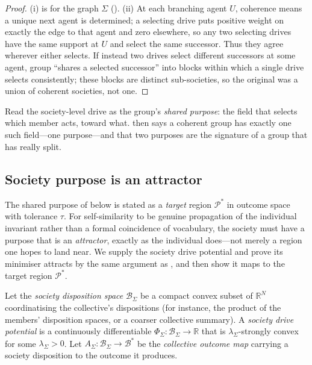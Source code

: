 \documentclass[11pt,twocolumn,a4paper]{article}
\newcommand{\R}{\mathbb{R}}
\newcommand{\Beh}{\mathcal{B}}       %
\newcommand{\Purp}{\mathcal{P}}      %
\newcommand{\Soc}{\Sigma}            %
\begin{document}
\begin{proof}
(i) is  for the graph $\Soc$ ().
(ii) At each branching agent $U$, coherence means a unique next agent is
determined; a selecting drive puts positive weight on exactly the edge to
that agent and zero elsewhere, so any two selecting drives have the same
support at $U$ and select the same successor. Thus they agree wherever
either selects. If instead two drives select different successors at some
agent, group ``shares a selected successor'' into blocks within which a
single drive selects consistently; these blocks are distinct
sub-societies, so the original was a union of coherent societies, not one.
\end{proof}

\begin{remark}
\label{rem:schism}
Read the society-level drive as the group's \emph{shared purpose}: the
field that selects which member acts, toward what. 
then says a coherent group has exactly one such field---one purpose---and
that two purposes are the signature of a group that has really split.
\end{remark}

\subsection{Society purpose is an attractor}
\label{sec:socpurpose}

The shared purpose of  below is stated as a
\emph{target} region $\Purp^\ast$ in outcome space with tolerance $\tau$.
For self-similarity to be genuine propagation of the individual invariant
rather than a formal coincidence of vocabulary, the society must have a
purpose that is an \emph{attractor}, exactly as the individual does---not
merely a region one hopes to land near. We supply the society drive
potential and prove its minimiser attracts by the same argument as
, and then show it maps to the
target region $\Purp^\ast$.

\begin{definition}
\label{def:socdrive}
Let the \emph{society disposition space} $\Beh_\Soc$ be a compact convex
subset of $\R^N$ coordinatising the collective's dispositions (for
instance, the product of the members' disposition spaces, or a coarser
collective summary). A \emph{society drive potential} is a continuously
differentiable $\Phi_\Soc:\Beh_\Soc\to\R$ that is $\lambda_\Soc$-strongly
convex for some $\lambda_\Soc>0$. Let $A_\Soc:\Beh_\Soc\to\Beh^\ast$ be the
\emph{collective outcome map} carrying a society disposition to the
outcome it produces.
\end{definition}
\end{document}
